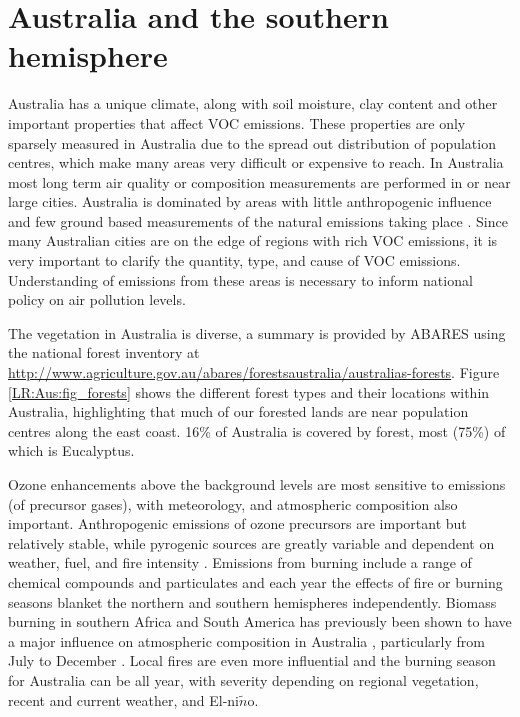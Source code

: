 \section{Australia and the southern hemisphere}
\label{LR:Aus}
  
  Australia has a unique climate, along with soil moisture, clay content and other important properties that affect VOC emissions.
  These properties are only sparsely measured in Australia due to the spread out distribution of population centres, which make many areas very difficult or expensive to reach.
  In Australia most long term air quality or composition measurements are performed in or near large cities.
  Australia is dominated by areas with little anthropogenic influence and few ground based measurements of the natural emissions taking place \parencite{VanDerA2008}.
  Since many Australian cities are on the edge of regions with rich VOC emissions, it is very important to clarify the quantity, type, and cause of VOC emissions.
  Understanding of emissions from these areas is necessary to inform national policy on air pollution levels.
  
  The vegetation in Australia is diverse, a summary is provided by ABARES using the national forest inventory at  \url{http://www.agriculture.gov.au/abares/forestsaustralia/australias-forests}.
  Figure \ref{LR:Aus:fig_forests} shows the different forest types and their locations within Australia, highlighting that much of our forested lands are near population centres along the east coast.
  16\% of Australia is covered by forest, most (75\%) of which is Eucalyptus.
  
  
  Ozone enhancements above the background levels are most sensitive to emissions (of precursor gases), with meteorology, and atmospheric composition also important.
  Anthropogenic emissions of ozone precursors are important but relatively stable, while pyrogenic sources are greatly variable and dependent on weather, fuel, and fire intensity \parencite[e.g.][]{Lawson2017}. 
  Emissions from burning include a range of chemical compounds and particulates and each year the effects of fire or burning seasons blanket the northern and southern hemispheres independently.
  Biomass burning in southern Africa and South America has previously been shown to have a major influence on atmospheric composition in Australia \parencite{Oltmans2001, Gloudemans2006, Edwards2006}, particularly from July to December \parencite{Pak2003, Liu2016}.
  Local fires are even more influential and the burning season for Australia can be all year, with severity depending on regional vegetation, recent and current weather, and El-ni$\tilde{n}$o.
  
